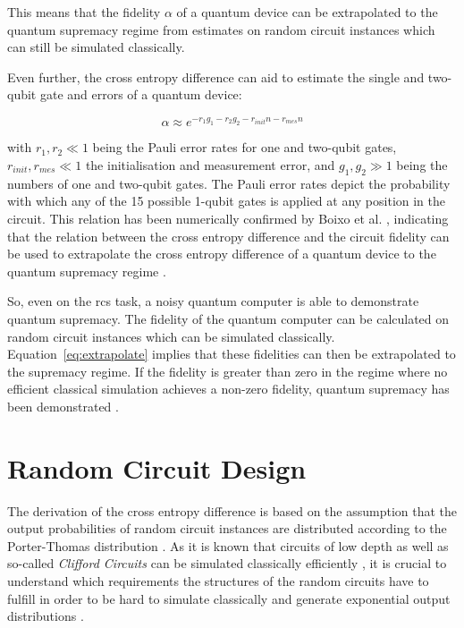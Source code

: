 This means that the fidelity $\alpha$ of a quantum device can be extrapolated to
the quantum supremacy regime from estimates on random circuit instances
which can still be simulated classically.

Even further, the cross entropy difference can aid to estimate
the single and two-qubit gate and errors of a quantum device:

\begin{equation}
  \alpha \approx e^{-r_1g_1 - r_2g_2 -r_{init}n -r_{mes}n}
\end{equation}

with $r_1, r_2 \ll 1$ being the Pauli error rates for one and two-qubit gates, $r_{init},
r_{mes} \ll 1$ the initialisation and measurement error, and $g_1,g_2 \gg 1$ being the
numbers of one and two-qubit gates. The Pauli error rates depict the 
probability with which any of the 15 possible 1-qubit gates is applied at any position in the circuit.
This relation has been numerically confirmed by
Boixo et al. \cite{Boixo2018supremacy}, indicating that the relation between the
cross entropy difference and the circuit fidelity can be used to extrapolate the
cross entropy difference of a quantum device to the quantum supremacy regime \cite{Boixo2018supremacy}.

So, even on the \gls{rcs} task, a noisy quantum computer is able to demonstrate quantum
supremacy. The fidelity of the quantum computer can be calculated on random circuit instances which can be simulated
classically. Equation~\ref{eq:extrapolate} implies that these fidelities can then be extrapolated to 
the supremacy regime.
If the fidelity is greater than zero in the regime where no efficient classical simulation achieves
a non-zero fidelity,
quantum supremacy has been demonstrated \cite{Boixo2018supremacy}.

\section{Random Circuit Design}
\label{sec:random_circuit_design}

The derivation of the cross entropy difference is based on the assumption that the
output probabilities of random circuit instances are distributed according to
the Porter-Thomas distribution \cite{Boixo2018supremacy}. As it is known that circuits of low depth as
well as so-called \textit{Clifford Circuits} can be simulated classically
efficiently \cite{gottesman1998heisenberg}, it is crucial to understand which requirements the structures of
the random circuits have to fulfill in order to be hard to simulate classically and generate
exponential output distributions \cite{Boixo2018supremacy}.

